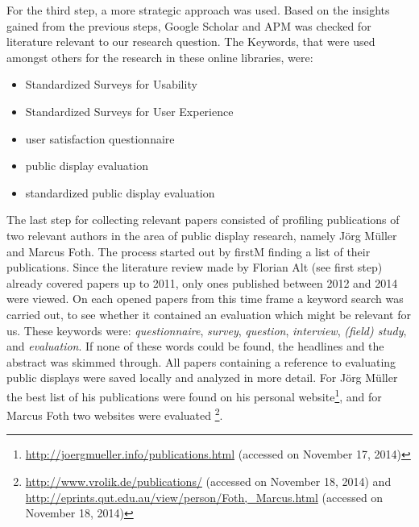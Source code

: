 	For the third step, a more strategic approach was used. Based on the insights gained from the previous steps, Google Scholar and APM was checked for literature relevant to our research question. The Keywords, that were used amongst others for the research in these online libraries, were:

	\begin{itemize}[itemsep=0pt] 
	\item Standardized Surveys for Usability
	\item Standardized Surveys for User Experience
	\item user satisfaction questionnaire
	\item public display evaluation
	\item standardized public display evaluation
	\end{itemize}

	The last step for collecting relevant papers consisted of profiling publications of two relevant authors in the area of public display research, namely J\"org M\"uller and Marcus Foth. The process started out by firstM finding a list of their publications. Since the literature review made by Florian Alt (see first step) already covered papers up to 2011, only ones published between 2012 and 2014 were viewed. 
	On each opened papers from this time frame a keyword search was carried out, to see whether it contained an evaluation which might be relevant for us. These keywords were: \textit{questionnaire}, \textit{survey}, \textit{question}, \textit{interview}, \textit{(field) study}, and \textit{evaluation}. If none of these words could be found, the headlines and the abstract was skimmed through. All papers containing a reference to evaluating public displays were saved locally and analyzed in more detail.
	For J\"org M\"uller the best list of his publications were found on his personal website\footnote{\url{http://joergmueller.info/publications.html} (accessed on November 17, 2014)}, and for Marcus Foth two websites were evaluated \footnote{\url{http://www.vrolik.de/publications/} (accessed on November 18, 2014) and \url{http://eprints.qut.edu.au/view/person/Foth,_Marcus.html} (accessed on November 18, 2014)}. 






